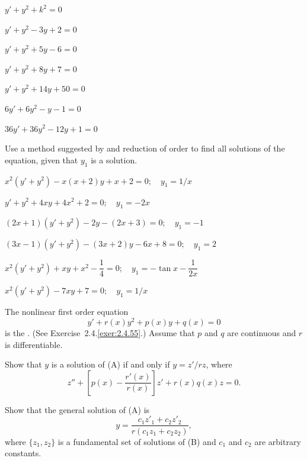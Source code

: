 \begin{exerciselist}
\begin{alist*}[columns=2]
\item $y'+y^2+k^2=0$
\item $y'+y^2-3y+2=0$
\item $y'+y^2+5y-6=0$
\item $y'+y^2+8y+7=0$
\item $y'+y^2+14y+50=0$
\item $6y'+6y^2-y-1=0$
\item $36y'+36y^2-12y+1=0$
\end{alist*}

\item\label{exer:5.6.39}Use a method suggested by  and reduction of
order to find all solutions of the  equation, given that $y_1$ is
a solution.

\begin{alist}
\item %
$x^2(y'+y^2)-x(x+2)y+x+2=0;  \quad y_1=1/x$

\item %
$y'+y^2+4xy+4x^2+2=0;   \quad y_1=-2x$

\item %
$(2x+1)(y'+y^2)-2y-(2x+3)=0;   \quad y_1=-1$

\item %
$(3x-1)(y'+y^2)-(3x+2)y-6x+8=0;   \quad y_1=2$

\item %
$x^2(y'+y^2)+xy+x^2- \dfrac{1}{4}=0; \quad y_1=-\tan x -\dfrac{1}{2x}$

\item %
$x^2(y'+y^2)-7xy+7=0;  \quad y_1=1/x$

\end{alist}

\item\label{exer:5.6.40}The nonlinear first order equation
\[
 y'+r(x)y^2+p(x)y+q(x)=0
\tag{A}
\]
is  the
.
(See {Exercise~2.4.\ref{exer:2.4.55}}.)
Assume that $p$ and $q$ are continuous and $r$ is differentiable.

\begin{alist}
\item %
Show that $y$ is a solution of  (A) if and only if
 $y={z'/rz}$,  where
\[
 z''+\left[p(x)-\frac{r'(x)}{r(x)}\right]
z'+r(x)q(x)z=0.
\tag{B}
\]

\item %
 Show that the general solution of (A) is
\[
 y=\frac{c_1z'_1+c_2z'_2}{r(c_1z_1+c_2z_2)},
\]
where $\{z_1,z_2\}$ is a fundamental set of solutions of
(B) and $c_1$ and $c_2$ are arbitrary constants.
\end{alist}

\end{exerciselist}


